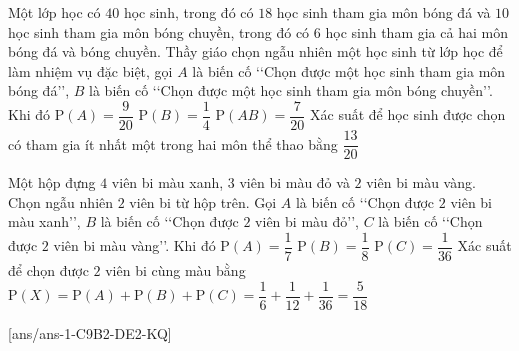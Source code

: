 \begin{ex}%
	Một lớp học có $40$ học sinh, trong đó có $18$ học sinh tham gia môn bóng đá và $10$ học sinh tham gia môn bóng chuyền, trong đó có $6$ học sinh tham gia cả hai môn bóng đá và bóng chuyền. Thầy giáo chọn ngẫu nhiên một học sinh từ lớp học để làm nhiệm vụ đặc biệt, gọi $A$ là biến cố \lq\lq Chọn được một học sinh tham gia môn bóng đá\rq\rq, $B$ là biến cố \lq\lq Chọn được một học sinh tham gia môn bóng chuyền\rq\rq. Khi đó
	\choiceTF
	{\True $\mathrm{P}(A)=\dfrac{9}{20}$}
	{\True $\mathrm{P}(B)=\dfrac{1}{4}$}
	{$\mathrm{P}(AB)=\dfrac{7}{20}$}
	{Xác suất để học sinh được chọn có tham gia ít nhất một trong hai môn thể thao bằng $\dfrac{13}{20}$}
\end{ex}

\begin{ex}%
	Một hộp đựng $4$ viên bi màu xanh, $3$ viên bi màu đỏ và $2$ viên bi màu vàng. Chọn ngẫu nhiên $2$ viên bi từ hộp trên. Gọi $A$ là biến cố \lq\lq Chọn được $2$ viên bi màu xanh\rq\rq, $B$ là biến cố \lq\lq Chọn được $2$ viên bi màu đỏ\rq\rq, $C$ là biến cố \lq\lq Chọn được $2$ viên bi màu vàng\rq\rq. Khi đó
	\choiceTF
	{$\mathrm{P}(A)=\dfrac{1}{7}$}
	{$\mathrm{P}(B)=\dfrac{1}{8}$}
	{\True $\mathrm{P}(C)=\dfrac{1}{36}$}
	{\True Xác suất để chọn được $2$ viên bi cùng màu bằng $\mathrm{P}(X)=\mathrm{P}(A)+\mathrm{P}(B)+\mathrm{P}(C)=\dfrac{1}{6}+\dfrac{1}{12}+\dfrac{1}{36}=\dfrac{5}{18}$}
\end{ex}
[ans/ans-1-C9B2-DE2-KQ]
\caukq

